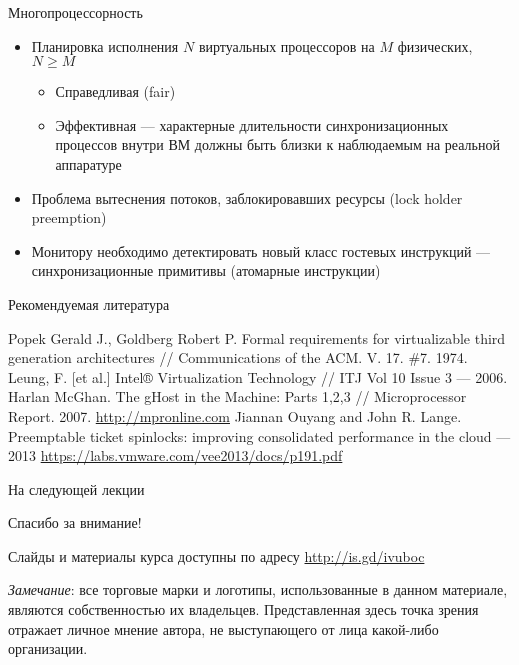 \documentclass{beamer}
\begin{document}
\begin{frame}{Многопроцессорность}
\begin{itemize}
    \item Планировка исполнения $N$ виртуальных процессоров на $M$ физических, $N \geqslant M$
    \begin{itemize}
        \item Справедливая (fair)
        \item Эффективная — характерные длительности синхронизационных процессов внутри ВМ должны быть близки к наблюдаемым на реальной аппаратуре
    \end{itemize}
\end{itemize}

\begin{itemize}
    \item Проблема вытеснения потоков, заблокировавших ресурсы (lock holder preemption)
    \item Монитору необходимо детектировать новый класс гостевых инструкций — синхронизационные примитивы (атомарные инструкции)
\end{itemize}

\end{frame}

\begin{frame}[allowframebreaks]{Рекомендуемая литература}
\begin{thebibliography}{99}
 Popek Gerald J., Goldberg Robert P. Formal requirements for virtualizable third generation architectures // Communications of the ACM. V. 17. \#7. 1974.
 Leung, F. [et al.] Intel® Virtualization Technology // ITJ Vol 10 Issue 3 — 2006.
 Harlan McGhan. The gHost in the Machine: Parts 1,2,3 // Microprocessor Report. 2007. \url{http://mpronline.com}
 Jiannan Ouyang and John R. Lange. Preemptable ticket spinlocks: improving consolidated performance in the cloud — 2013 \url{https://labs.vmware.com/vee2013/docs/p191.pdf}

\end{thebibliography}
\end{frame}


\begin{frame}{На следующей лекции}
\centering


\end{frame}


\begin{frame}

{\huge{Спасибо за внимание!}\par}

\vfill

Слайды и материалы курса доступны по адресу \url{http://is.gd/ivuboc} %

\vfill

\tiny{\textit{Замечание}: все торговые марки и логотипы, использованные в данном материале, являются собственностью их владельцев. Представленная здесь точка зрения отражает личное мнение автора, не выступающего от лица какой-либо организации.}

\end{frame}
\end{document}
